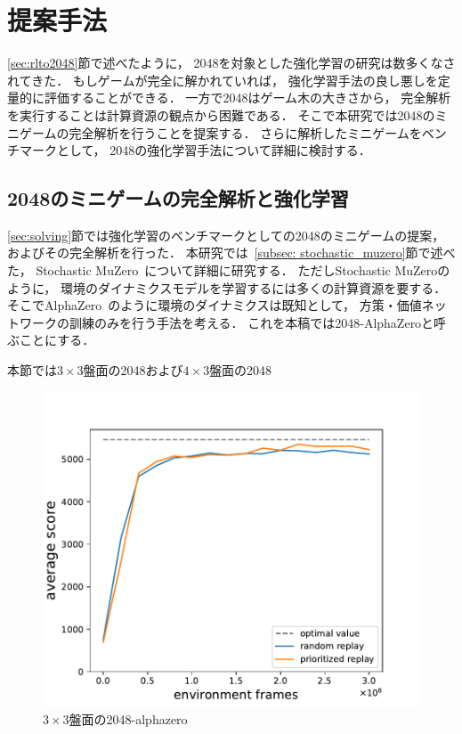 \chapter{提案手法}
\label{chap:proposal}
\ref{sec:rlto2048}節で述べたように， 2048を対象とした強化学習の研究は数多くなされてきた．
もしゲームが完全に解かれていれば， 強化学習手法の良し悪しを定量的に評価することができる．
一方で2048はゲーム木の大きさから， 完全解析を実行することは計算資源の観点から困難である．
そこで本研究では2048のミニゲームの完全解析を行うことを提案する．
さらに解析したミニゲームをベンチマークとして， 2048の強化学習手法について詳細に検討する．



\section{2048のミニゲームの完全解析と強化学習}
\ref{sec:solving}節では強化学習のベンチマークとしての2048のミニゲームの提案， およびその完全解析を行った．
本研究では~\ref{subsec: stochastic_muzero}節で述べた， Stochastic MuZero~\cite{StochasticMuZero}について詳細に研究する．
ただしStochastic MuZeroのように， 環境のダイナミクスモデルを学習するには多くの計算資源を要する．
そこでAlphaZero~\cite{AlphaZero}のように環境のダイナミクスは既知として， 方策・価値ネットワークの訓練のみを行う手法を考える．
これを本稿では2048-AlphaZeroと呼ぶことにする．

本節では$3\times3$盤面の2048および$4\times3$盤面の2048

\begin{figure}[t]
    \centering
    \includegraphics[width=0.7\linewidth{}]{figures/alphazero_3x3.pdf}
    \caption{$3\times3$盤面の2048-alphazero}
    \label{fig:alphazero_3x3}
\end{figure}